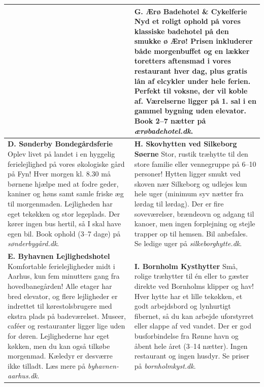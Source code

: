 {\begin{longtable}{@{} >{\raggedright\arraybackslash}p{8.2cm} @{\hspace{0.6cm}\extracolsep{\fill}} >{\raggedright\arraybackslash}p{8.2cm} @{}}
&
\textbf{\color{NCDNavy}G. Ærø Badehotel \& Cykelferie}\newline
Nyd et roligt ophold på vores klassiske badehotel på den smukke ø Ærø! Prisen inkluderer både morgenbuffet og en lækker toretters aftensmad i vores restaurant hver dag, plus gratis lån af elcykler under hele ferien. Perfekt til voksne, der vil koble af. Værelserne ligger på 1. sal i en gammel bygning uden elevator. Book 2--7 nætter på \textit{ærøbadehotel.dk}.
\\
\midrule
\textbf{\color{NCDNavy}D. Sønderby Bondegårdsferie}\newline
Oplev livet på landet i en hyggelig ferielejlighed på vores økologiske gård på Fyn! Hver morgen kl. 8.30 må børnene hjælpe med at fodre geder, kaniner og høns samt samle friske æg til morgenmaden. Lejligheden har eget tekøkken og stor legeplads. Der kører ingen bus hertil, så I skal have egen bil. Book ophold (3--7 dage) på \textit{sønderbygård.dk}.
&
\textbf{\color{NCDNavy}H. Skovhytten ved Silkeborg Søerne}\newline
Stor, rustik træhytte til den store familie eller vennegruppe på 6--10 personer! Hytten ligger smukt ved skoven nær Silkeborg og udlejes kun hele uger (minimum syv nætter fra lørdag til lørdag). Der er fire soveværelser, brændeovn og adgang til kanoer, men ingen forplejning og stejle trapper op til hemsen. Bil anbefales. Se ledige uger på \textit{silkeborghytte.dk}.
\\
\midrule
\textbf{\color{NCDNavy}E. Byhavnen Lejlighedshotel}\newline
Komfortable ferielejligheder midt i Aarhus, kun fem minutters gang fra hovedbanegården! Alle etager har bred elevator, og flere lejligheder er indrettet til kørestolsbrugere med ekstra plads på badeværelset. Museer, caféer og restauranter ligger lige uden for døren. Lejlighederne har eget køkken, men du kan også tilkøbe morgenmad. Kæledyr er desværre ikke tilladt. Læs mere på \textit{byhavnen-aarhus.dk}.
&
\textbf{\color{NCDNavy}I. Bornholm Kysthytter}\newline
Små, rolige træhytter til én eller to gæster direkte ved Bornholms klipper og hav! Hver hytte har et lille tekøkken, et godt arbejdsbord og lynhurtigt fibernet, så du kan arbejde uforstyrret eller slappe af ved vandet. Der er god busforbindelse fra Rønne havn og åbent hele året (3--14 nætter). Ingen restaurant og ingen husdyr. Se priser på \textit{bornholmkyst.dk}.
\\
\end{longtable}
}

